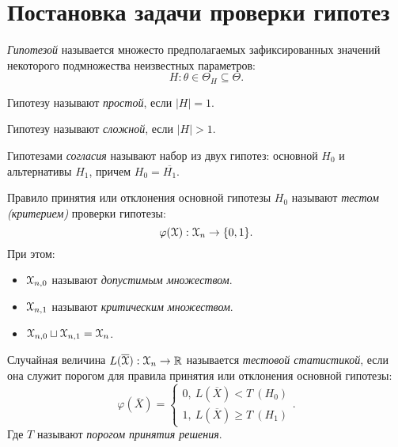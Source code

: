 \section{Постановка задачи проверки гипотез}

\begin{definition}
	\textit{Гипотезой} называется множесто предполагаемых зафиксированных значений
	некоторого подмножества неизвестных параметров:
	\[
		H: \theta \in \Theta_{H} \subseteq \Theta
	.\]
\end{definition}

\begin{definition}
	Гипотезу называют \textit{простой}, если $|H| = 1$.
\end{definition}

\begin{definition}
	Гипотезу называют \textit{сложной}, если $|H| > 1$.
\end{definition}

\begin{definition}
	Гипотезами \textit{согласия} называют набор из двух гипотез: основной $H_0$ и
	альтернативы $H_1$, причем $H_0 = \overline{H_1}$.
\end{definition}

\begin{definition}
	Правило принятия или отклонения основной гипотезы $H_0$ называют
	\textit{тестом (критерием)} проверки гипотезы:
	\[
		\varphi(\mathcal{X}): \mathcal{X}_{n} \to \{0, 1\}
	.\]
	При этом:
	\begin{itemize}
		\item $\mathcal{X}_{n, 0}$ называют \textit{допустимым множеством}.
		\item $\mathcal{X}_{n, 1}$ называют \textit{критическим множеством}.
		\item $\mathcal{X}_{n, 0} \sqcup \mathcal{X}_{n, 1} = \mathcal{X}_{n}$.
	\end{itemize}
\end{definition}

\begin{definition}
	Случайная величина $L(\overline{\mathcal{X}}): \mathcal{X}_n \to \mathbb{R}$ называется
	\textit{тестовой статистикой}, если она служит порогом для правила принятия
	или отклонения основной гипотезы:
	\[
		\varphi(\overline{X}) = \begin{cases}
			0,~ L(\overline{X}) < T \> (H_0) \\
			1,~ L(\overline{X}) \geqslant T \> (H_1)
		\end{cases}
	.\]
	Где $T$ называют \textit{порогом принятия решения}.
\end{definition}

